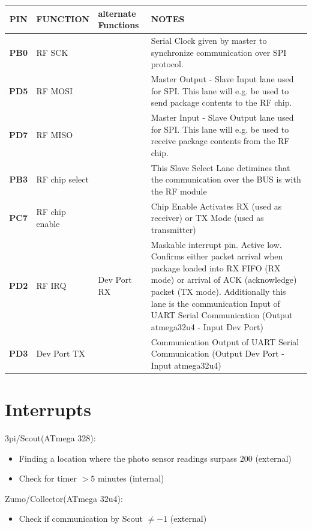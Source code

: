 \documentclass[12pt]{article}
\begin{document}
\small
\begin{tabular}{| c || p{30mm} | p{30mm} | p{60mm} |}
  \hline
  \textbf{PIN} & FUNCTION & alternate Functions & NOTES\\
  \hline
  \hline
  \textbf{PB0} & RF SCK &  & Serial Clock given by master to synchronize communication over SPI protocol. \\
  \hline
  \textbf{PD5} & RF MOSI &  & Master Output - Slave Input lane used for SPI. This lane will e.g. be used to send package contents to the RF chip.\\
  \hline
  \textbf{PD7} & RF MISO &  & Master Input - Slave Output lane used for SPI. This lane will e.g. be used to receive package contents from the RF chip.\\
  \hline
  \textbf{PB3} & RF chip select &  & This Slave Select Lane detimines that the communication over the BUS is with the RF module\\
  \hline
  \textbf{PC7} & RF chip enable &  & Chip Enable Activates RX (used as receiver) or TX Mode (used as transmitter) \\
  \hline
  \textbf{PD2} & RF IRQ & Dev Port RX & Maskable interrupt pin. Active low. Confirms either packet arrival when package loaded into RX FIFO (RX mode) or arrival of ACK (acknowledge) packet (TX mode). Additionally this lane is the communication Input of UART Serial Communication (Output atmega32u4 - Input Dev Port) \\
  \hline
  \textbf{PD3} & Dev Port TX &  & Communication Output of UART Serial Communication (Output Dev Port - Input atmega32u4) \\
  \hline
\end{tabular}
\normalsize

\newpage
\section*{Interrupts}
3pi/Scout(ATmega 328): \\
\begin{itemize}
\item Finding a location where the photo sensor readings surpass 200 (external)
\item Check for timer $> 5$ minutes (internal)
\end{itemize}
Zumo/Collector(ATmega 32u4): \\
\begin{itemize}
\item Check if communication by Scout $\neq -1$ (external)
\end{itemize} 
\end{document}
